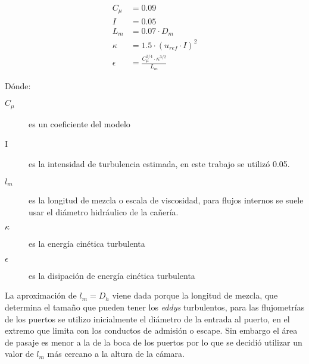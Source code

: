 \begin{align}
    C_{\mu}  &= 0.09 \\
    I        &= 0.05 \\
    L_m      &= 0.07 \cdot D_m \\
    \kappa   &= 1.5 \cdot \left( u_{ref} \cdot I \right) ^ 2 \\
    \epsilon &= \frac{C_\mu ^{3/4} \cdot \kappa ^{3/2}} {L_m}
\end{align}

Dónde:
%
\begin{description}
    \item[$C_{\mu}$] es un coeficiente del modelo
    \item[I] es la intensidad de turbulencia estimada, en este trabajo se utilizó 0.05.
    \item[$l_m$] es la longitud de mezcla o escala de viscosidad, para flujos
        internos se suele usar el diámetro hidráulico de la cañería.
    \item[$\kappa$] es la energía cinética turbulenta
    \item[$\epsilon$] es la disipación de energía cinética turbulenta
\end{description}

La aproximación de $l_m = D_h$ viene dada porque la longitud de mezcla, que
determina el tamaño que pueden tener los \emph{eddys} turbulentos, para las
flujometrías de los puertos se utilizo inicialmente el diámetro de la entrada
al puerto, en el extremo que limita con los conductos de admisión o escape.
%
Sin embargo el área de pasaje es menor a la de la boca de los puertos por lo
que se decidió utilizar un valor de $l_m$ más cercano a la altura de la cámara.


